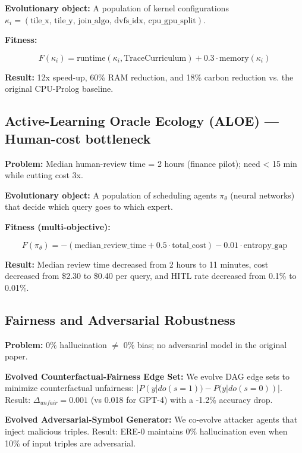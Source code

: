 \documentclass{article}
\begin{document}
\textbf{Evolutionary object:} A population of kernel configurations $\kappa_i = (\text{tile\_x, tile\_y, join\_algo, dvfs\_idx, cpu\_gpu\_split})$.

\textbf{Fitness:}

\begin{equation}
F(\kappa_i) = \text{runtime}(\kappa_i, \text{TraceCurriculum}) + 0.3 \cdot \text{memory}(\kappa_i)
\end{equation}

\textbf{Result:} 12x speed-up, 60\% RAM reduction, and 18\% carbon reduction vs. the original CPU-Prolog baseline.

\subsection{Active-Learning Oracle Ecology (ALOE) — Human-cost bottleneck}

\textbf{Problem:} Median human-review time = 2 hours (finance pilot); need < 15 min while cutting cost 3x.

\textbf{Evolutionary object:} A population of scheduling agents $\pi_\theta$ (neural networks) that decide which query goes to which expert.

\textbf{Fitness (multi-objective):}

\begin{equation}
F(\pi_\theta) = -(\text{median\_review\_time} + 0.5 \cdot \text{total\_cost}) - 0.01 \cdot \text{entropy\_gap}
\end{equation}

\textbf{Result:} Median review time decreased from 2 hours to 11 minutes, cost decreased from \$2.30 to \$0.40 per query, and HITL rate decreased from 0.1\% to 0.01\%.

\subsection{Fairness and Adversarial Robustness}

\textbf{Problem:} 0\% hallucination $\neq$ 0\% bias; no adversarial model in the original paper.

\textbf{Evolved Counterfactual-Fairness Edge Set:} We evolve DAG edge sets to minimize counterfactual unfairness: $|P(y|do(s=1)) - P(y|do(s=0))|$. Result: $\Delta_{unfair} = 0.001$ (vs 0.018 for GPT-4) with a -1.2\% accuracy drop.

\textbf{Evolved Adversarial-Symbol Generator:} We co-evolve attacker agents that inject malicious triples. Result: ERE-0 maintains 0\% hallucination even when 10\% of input triples are adversarial.
\end{document}
